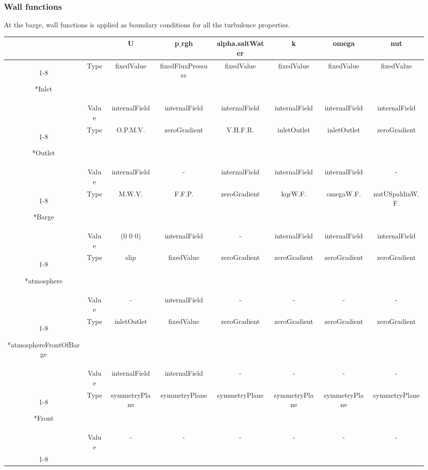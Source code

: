 \documentclass[a4paper, 12pt]{report}
\begin{document}
\subsubsection{Wall functions}
 At the barge, wall functions is applied as boundary conditions for all the turbulence properties. 
\begin{landscape}
	\begin{table}[H]
		\centering
		\begin{tabular}{c|c|c|c|c|c|c|c}
			\multicolumn{2}{c|}{\diagbox{Boundary}{Variable}} & U&p$\_$rgh & alpha.saltWater  & k & omega & nut \\\cline{1-8}
			
			\multirow{2}*{Inlet} & Type & fixedValue & fixedFluxPressure & fixedValue &  fixedValue & fixedValue & fixedValue\\
			&Value & internalField & internalField & internalField &  internalField & internalField &internalField \\\cline{1-8}
			
			\multirow{2}*{Outlet} & Type & O.P.M.V. & zeroGradient & V.H.F.R. &  inletOutlet & inletOutlet & zeroGradient\\
			&Value & internalField & - & internalField &  internalField & internalField &- \\\cline{1-8}
			
			\multirow{2}*{Barge} & Type & M.W.V. & F.F.P. & zeroGradient & kqrW.F. & omegaW.F. & nutUSpaldinW.F.\\
			&Value & (0 0 0) & internalField & - & internalField & internalField &internalField \\\cline{1-8}
			
			\multirow{2}*{atmosphere} & Type & slip & fixedValue & zeroGradient & zeroGradient & zeroGradient & zeroGradient\\
			&Value & - & internalField & - &  - &- &-\\\cline{1-8}
			
			\multirow{2}*{atmosphereFrontOfBarge} & Type & inletOutlet & fixedValue & zeroGradient &  zeroGradient & zeroGradient & zeroGradient\\
			&Value & internalField & internalField & - & - & - &-\\\cline{1-8}
			
			\multirow{2}*{Front} & Type & symmetryPlane & symmetryPlane & symmetryPlane &  symmetryPlane &symmetryPlane & symmetryPlane\\
			&Value & - & -& - & - &- &-\\\cline{1-8}
			

\end{tabular}
\end{table}
\end{landscape}
\end{document}
